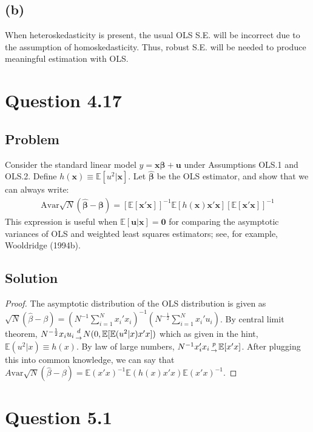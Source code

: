 \documentclass[10pt, a4paper]{article}
\newcommand{\EE}{\mathbb E}
\newcommand{\var}{\text{var}}
\begin{document}
    \subsection*{(b)}
      When heteroskedasticity is present, the usual OLS S.E. will be incorrect due to the assumption of homoskedasticity. Thus, robust S.E. will be needed to produce meaningful estimation with OLS.
\section*{Question 4.17}
  \subsection*{Problem}
    Consider the standard linear model $y = \boldsymbol{x}\boldsymbol{\beta} + \boldsymbol{u}$ under Assumptions OLS.1 and OLS.2. Define $h(\boldsymbol{x}) \equiv \mathbb{E}[u^2 | \boldsymbol{x}]$. Let $\hat{\boldsymbol{\beta}}$ be the OLS estimator, and show that we can always write:
    \begin{align}
    \text{Avar}\sqrt{N}(\hat{\boldsymbol{\beta}} - \boldsymbol{\beta}) = \left[\mathbb{E}[\boldsymbol{x}'\boldsymbol{x}]\right]^{-1} \mathbb{E}[h(\boldsymbol{x})\boldsymbol{x}'\boldsymbol{x}]\left[\mathbb{E}[\boldsymbol{x}'\boldsymbol{x}]\right]^{-1}
    \end{align}
    This expression is useful when $\mathbb{E}[\boldsymbol{u} | \boldsymbol{x}] = \boldsymbol{0}$ for comparing the asymptotic variances of OLS and weighted least squares estimators; see, for example, Wooldridge (1994b).
  \subsection*{Solution}
    \begin{proof}
      The asymptotic distribution of the OLS distribution is given as $\sqrt{N}(\hat{\beta}-\beta) = (N^{-1}\sum\limits_{i=1}^Nx_i'x_i)^{-1}(N^{-\frac{1}{2}}\sum\limits_{i=1}^Nx_i'u_i)$. By central limit theorem, $N^{-\frac{1}{2}}x_iu_i {d\atop{\rightarrow}} N(0,\EE[\EE(u^2|x)x'x])$ which as given in the hint, $\EE(u^2|x) \equiv h(x)$. By law of large numbers, $N^{-1}x_i'x_i {p\atop{\rightarrow}}\EE[x'x]$. After plugging this into common knowledge, we can say that $A\var\sqrt{N}(\hat{\beta}-\beta) = \EE(x'x)^{-1}\EE(h(x)x'x)\EE(x'x)^{-1}$. 
    \end{proof}
\section*{Question 5.1}
\end{document}

